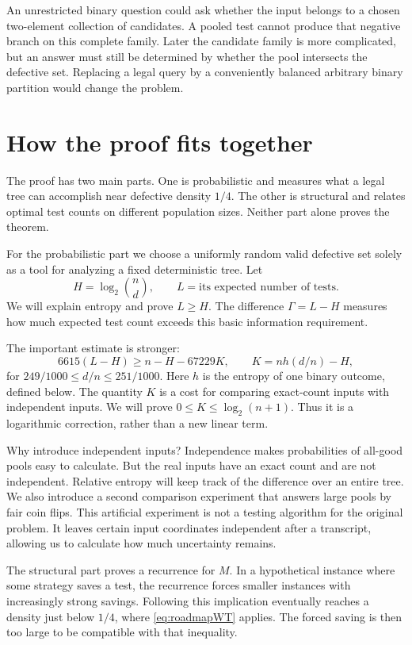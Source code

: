 \documentclass[11pt]{article}
\theoremstyle{definition}
\theoremstyle{remark}
\numberwithin{equation}{section}
\begin{document}
An unrestricted binary question could ask whether the input belongs
to a chosen two-element collection of candidates. A pooled test
cannot produce that negative branch on this complete family.
Later the candidate family is more complicated, but an answer must
still be determined by whether the pool intersects the defective set.
Replacing a legal query by a conveniently balanced arbitrary binary
partition would change the problem.

\section{How the proof fits together}\label{sec:roadmap}

The proof has two main parts. One is probabilistic and measures what
a legal tree can accomplish near defective density \(1/4\).
The other is structural and relates optimal test counts on different
population sizes. Neither part alone proves the theorem.

For the probabilistic part we choose a uniformly random valid
defective set solely as a tool for analyzing a fixed deterministic
tree. Let
\[
 H=\log_2\binom nd,\qquad L=\text{its expected number of tests}.
\]
We will explain entropy and prove \(L\ge H\). The difference
\(\Gamma=L-H\) measures how much expected test count exceeds this
basic information requirement.

The important estimate is stronger:
\begin{equation}\label{eq:roadmapWT}
 6615(L-H)\ge n-H-67229K,\qquad K=nh(d/n)-H,
\end{equation}
for \(249/1000\le d/n\le251/1000\).
Here \(h\) is the entropy of one binary outcome, defined below.
The quantity \(K\) is a cost for comparing exact-count inputs with
independent inputs. We will prove \(0\le K\le\log_2(n+1)\).
Thus it is a logarithmic correction, rather than a new linear term.

Why introduce independent inputs? Independence makes probabilities
of all-good pools easy to calculate. But the real inputs have an exact
count and are not independent. Relative entropy will keep track of
the difference over an entire tree.
We also introduce a second comparison experiment that answers large
pools by fair coin flips. This artificial experiment is not a testing
algorithm for the original problem. It leaves certain input coordinates
independent after a transcript, allowing us to calculate how much
uncertainty remains.

The structural part proves a recurrence for \(M\). In a hypothetical
instance where some strategy saves a test, the recurrence forces
smaller instances with increasingly strong savings. Following this
implication eventually reaches a density just below \(1/4\), where
\eqref{eq:roadmapWT} applies. The forced saving is then too large to
be compatible with that inequality.
\end{document}
